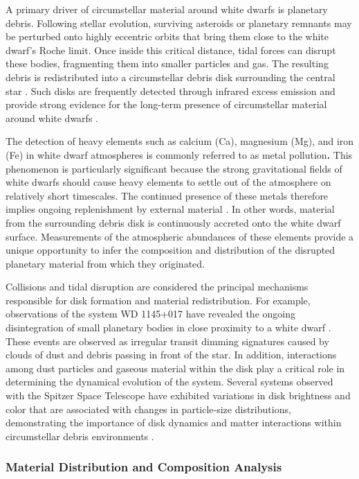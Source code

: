 A primary driver of circumstellar material around white dwarfs is planetary debris. Following stellar evolution, surviving asteroids or planetary remnants may be perturbed onto highly eccentric orbits that bring them close to the white dwarf's Roche limit. Once inside this critical distance, tidal forces can disrupt these bodies, fragmenting them into smaller particles and gas. The resulting debris is redistributed into a circumstellar debris disk surrounding the central star \cite{debes2012}. Such disks are frequently detected through infrared excess emission and provide strong evidence for the long-term presence of circumstellar material around white dwarfs \cite{zuckerman1987}.

The detection of heavy elements such as calcium (Ca), magnesium (Mg), and iron (Fe) in white dwarf atmospheres is commonly referred to as metal pollution\textbf{.} This phenomenon is particularly significant because the strong gravitational fields of white dwarfs should cause heavy elements to settle out of the atmosphere on relatively short timescales. The continued presence of these metals therefore implies ongoing replenishment by external material \cite{koester2014,farihi2010}. In other words, material from the surrounding debris disk is continuously accreted onto the white dwarf surface. Measurements of the atmospheric abundances of these elements provide a unique opportunity to infer the composition and distribution of the disrupted planetary material from which they originated.

Collisions and tidal disruption are considered the principal mechanisms responsible for disk formation and material redistribution. For example, observations of the system WD 1145+017 have revealed the ongoing disintegration of small planetary bodies in close proximity to a white dwarf \cite{vanderburg2015}. These events are observed as irregular transit dimming signatures caused by clouds of dust and debris passing in front of the star. In addition, interactions among dust particles and gaseous material within the disk play a critical role in determining the dynamical evolution of the system. Several systems observed with the Spitzer Space Telescope have exhibited variations in disk brightness and color that are associated with changes in particle-size distributions, demonstrating the importance of disk dynamics and matter interactions within circumstellar debris environments \cite{xu2018}.

\subsubsection{Material Distribution and Composition Analysis}

